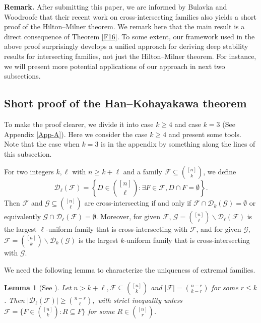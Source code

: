 \documentclass[11pt]{article}
\numberwithin{equation}{section}
\newtheorem{lemma}[theorem]{Lemma}
\begin{document}
\medskip 
\noindent
{\bf Remark.} After submitting this paper, we are informed by Bulavka and Woodroofe \cite{BW2024} that their recent work on cross-intersecting families also yields a short proof of the Hilton--Milner theorem. We remark here that the main result  \cite[Theorem 2]{BW2024} is a direct consequence of Theorem \ref{F16}. To some extent, our framework used in the above proof surprisingly develops a unified approach for deriving deep stability results for intersecting families, not just the Hilton--Milner theorem. For instance, we will present more potential applications of our approach  in next two subsections.  



\subsection{Short proof of the Han--Kohayakawa theorem}
To make the proof clearer, we divide it into case $k\geq 4$ and  case $k=3$ (See Appendix  \ref{App-A}). Here we consider the case $k\geq 4$ and present some tools.   Note that the case when $k=3$ is in the appendix by something along the lines of this subsection.

For two integers $k, \ell$ with $n \geq k+\ell$ and a family $\mathcal{F} \subseteq\binom{[n]}{k}$, we define
$$
\mathcal{D}_{\ell}(\mathcal{F})=\left\{D \in\binom{[n]}{\ell}: \exists F \in \mathcal{F}, D \cap F=\emptyset\right\}.
$$
Then  $\mathcal{F}$ and $\mathcal{G} \subseteq\binom{[n]}{\ell}$  are cross-intersecting if and only if $\mathcal{F} \cap \mathcal{D}_k(\mathcal{G})=\emptyset$ or equivalently $\mathcal{G} \cap \mathcal{D}_{\ell}(\mathcal{F})=\emptyset$. Moreover, for given $\mathcal{F}$, $\mathcal{G}=\binom{[n]}{\ell} \backslash \mathcal{D}_{\ell}(\mathcal{F})$ is the largest $\ell$-uniform  family that is cross-intersecting with $\mathcal{F}$, and for given $\mathcal{G}$, $\mathcal{F}=\binom{[n]}{k} \backslash \mathcal{D}_{k}(\mathcal{G})$ is the largest  $k$-uniform   family that is cross-intersecting with $\mathcal{G}$.

We need the following lemma to characterize the uniqueness of extremal families.


\begin{lemma}[See \cite{F86, M85}] \label{FM}
Let $n> k+\ell, \mathcal{F} \subseteq\binom{[n]}{k}$ and 
$ |\mathcal{F}|=\binom{n-r}{k-r}$ for some $r \leq k$. Then
$
\left|\mathcal{D}_{\ell}(\mathcal{F})\right| \geq\binom{ n-r}{\ell},
$
with strict inequality unless $\mathcal{F}=\big\{F \in\binom{[n]}{k}: R \subseteq F\big\}$ for some $R \in \binom{[n]}{r}$.
\end{lemma}
\end{document}
